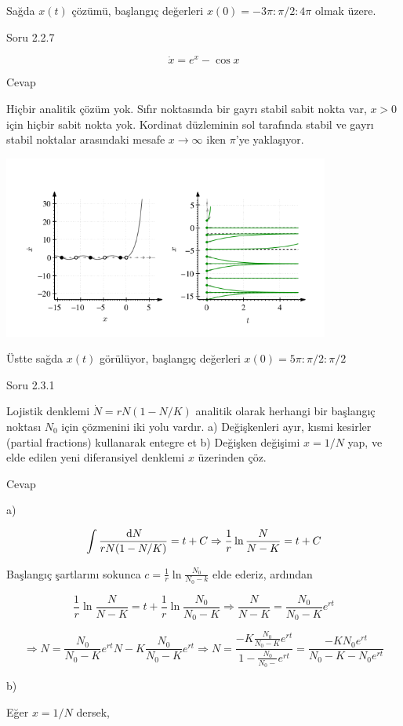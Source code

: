 \documentclass[12pt,fleqn]{article}\usepackage{../../common}
\begin{document}
Sağda $x(t)$ çözümü, başlangıç değerleri $x(0) = -3\pi : \pi/2 : 4\pi$ olmak
üzere.

Soru 2.2.7

$$
\dot{x} = e^x - \cos x
$$

Cevap

Hiçbir analitik çözüm yok. Sıfır noktasında bir gayrı stabil sabit nokta var,
$x>0$ için hiçbir sabit nokta yok. Kordinat düzleminin sol tarafında stabil ve
gayrı stabil noktalar arasındaki mesafe $x \to \infty$ iken $\pi$'ye
yaklaşıyor.

\includegraphics[height=6cm]{03_13.png}

Üstte sağda $x(t)$ görülüyor, başlangıç değerleri $x(0) = 5\pi : \pi/2 : \pi/2$

Soru 2.3.1

Lojistik denklemi $\dot{N} = rN (1-N/K)$ analitik olarak herhangi bir başlangıç
noktası $N_0$ için çözmenini iki yolu vardır. a) Değişkenleri ayır, kısmi
kesirler (partial fractions) kullanarak entegre et b) Değişken değişimi $x=1/N$
yap, ve elde edilen yeni diferansiyel denklemi $x$ üzerinden çöz.

Cevap

a)

$$
\int \frac{\,\mathrm{d} N}{rN(1-N/K)} = t + C \Rightarrow
\frac{1}{r} \ln \frac{N}{N-K} = t + C
$$

Başlangıç şartlarını sokunca $c = \frac{1}{r} \ln \frac{N_0}{N_0 - k}$ elde
ederiz, ardından

$$
\frac{1}{r} \ln \frac{N}{N-K} = t + \frac{1}{r} \ln \frac{N_0}{N_0 - K} \Rightarrow
\frac{N}{N-K} = \frac{N_0}{N_0 - K} e^{rt} 
$$

$$
\Rightarrow
N = \frac{N_0}{N_0 - K} e^{rt} N - K \frac{N_0}{N_0 - K}e^{rt} \Rightarrow
N = \frac{-K \frac{N_0}{N_0-K} e^{rt}}{1 - \frac{N_0}{N_0-}e^{rt}} =
\frac{-K N_0 e^{rt}}{N_0 - K - N_0e^{rt}}
$$

b)

Eğer $x=1/N$ dersek,
\end{document}
